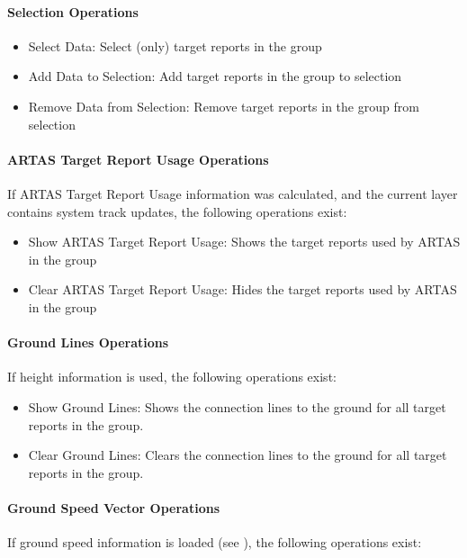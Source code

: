 \paragraph{Selection Operations}

\begin{itemize}
 \item Select Data: Select (only) target reports in the group
 \item Add Data to Selection: Add target reports in the group to selection
 \item Remove Data from Selection: Remove target reports in the group from selection
\end{itemize}

\paragraph{ARTAS Target Report Usage Operations}
If ARTAS Target Report Usage information was calculated, and the current layer contains system track updates, the following operations exist:

\begin{itemize}
 \item Show ARTAS Target Report Usage: Shows the target reports used by ARTAS in the group
 \item Clear ARTAS Target Report Usage: Hides the target reports used by ARTAS in the group
\end{itemize} 


\paragraph{Ground Lines Operations}
If height information is used, the following operations exist:

\begin{itemize}
 \item Show Ground Lines: Shows the connection lines to the ground for all target reports in the group.
 \item Clear Ground Lines: Clears the connection lines to the ground for all target reports in the group.
\end{itemize} 


\paragraph{Ground Speed Vector Operations}
If ground speed information is loaded (see ), the following operations exist:

